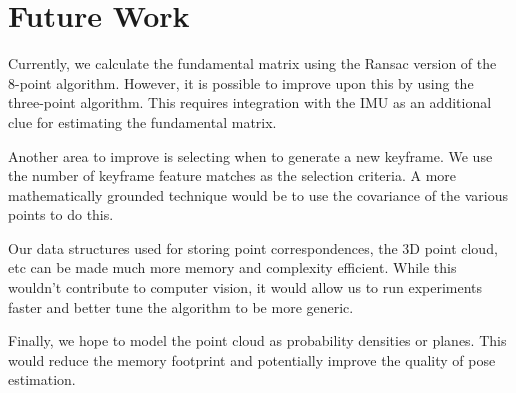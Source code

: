 \documentclass{article}
\begin{document}
\section{Future Work}

Currently, we calculate the fundamental matrix using the Ransac version of the 8-point algorithm. However, it is possible to improve upon this by using the three-point algorithm. This requires integration with the IMU as an additional clue for estimating the fundamental matrix.

Another area to improve is selecting when to generate a new keyframe. We use the number of keyframe feature matches as the selection criteria. A more mathematically grounded technique would be to use the covariance of the various points to do this.

Our data structures used for storing point correspondences, the 3D point cloud, etc can be made much more memory and complexity efficient. While this wouldn't contribute to computer vision, it would allow us to run experiments faster and better tune the algorithm to be more generic.

Finally, we hope to model the point cloud as probability densities or planes. This would reduce the memory footprint and potentially improve the quality of pose estimation.

\end{document}
